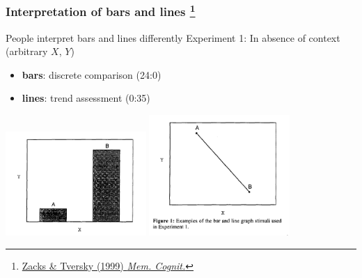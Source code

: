 \begin{frame}
  \frametitle{Interpretation of bars and lines
  \footnote{\tiny{\href{http://link.springer.com/article/10.3758/BF03201236}{Zacks \& Tversky (1999) \textit{Mem. Cognit.}}}}
  }
  \begin{alertblock}{People interpret bars and lines differently}
  Experiment 1: In absence of context (arbitrary $X$, $Y$)
    \begin{itemize}
      \item \textbf{bars}: discrete comparison (24:0)
      \item \textbf{lines}: trend assessment (0:35)
    \end{itemize}
  \end{alertblock}
  \begin{center}
    \includegraphics[width=0.4\textwidth,valign=t]{images/bars_v_lines_expt1a}    
    \includegraphics[width=0.4\textwidth,valign=t]{images/bars_v_lines_expt1b}  
  \end{center}
\end{frame}

